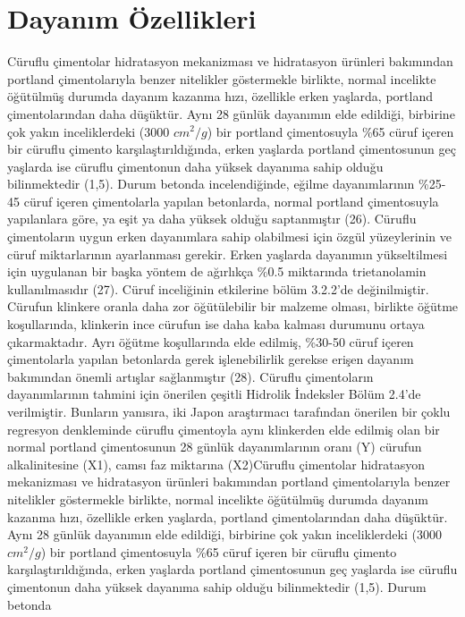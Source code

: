 \documentclass[12pt]{article}
\begin{document}
\section{Dayanım Özellikleri}
Cüruflu çimentolar hidratasyon mekanizması ve hidratasyon ürünleri
bakımından portland çimentolarıyla benzer nitelikler göstermekle birlikte,
normal incelikte öğütülmüş durumda dayanım kazanma hızı, özellikle erken
yaşlarda, portland çimentolarından daha düşüktür. Aynı 28 günlük dayanımın
elde edildiği, birbirine çok yakın inceliklerdeki (3000 $cm^2/g$) bir portland
çimentosuyla \%65 cüruf içeren bir cüruflu çimento karşılaştırıldığında,
erken yaşlarda portland çimentosunun geç yaşlarda ise cüruflu çimentonun
daha yüksek dayanıma sahip olduğu bilinmektedir (1,5). Durum betonda
incelendiğinde, eğilme dayanımlarının \%25-45 cüruf içeren çimentolarla
yapılan betonlarda, normal portland çimentosuyla yapılanlara göre, ya eşit
ya daha yüksek olduğu saptanmıştır (26).
Cüruflu çimentoların uygun erken dayanımlara sahip olabilmesi için özgül
yüzeylerinin ve cüruf miktarlarının ayarlanması gerekir. Erken yaşlarda
dayanımın yükseltilmesi için uygulanan bir başka yöntem de ağırlıkça \%0.5
miktarında trietanolamin kullanılmasıdır (27).
Cüruf inceliğinin etkilerine bölüm 3.2.2’de değinilmiştir. Cürufun klinkere
oranla daha zor öğütülebilir bir malzeme olması, birlikte öğütme koşullarında,
klinkerin ince cürufun ise daha kaba kalması durumunu ortaya çıkarmaktadır.
Ayrı öğütme koşullarında elde edilmiş, \%30-50 cüruf içeren çimentolarla
yapılan betonlarda gerek işlenebilirlik gerekse erişen dayanım bakımından
önemli artışlar sağlanmıştır (28).
Cüruflu çimentoların dayanımlarının tahmini için önerilen çeşitli Hidrolik
İndeksler Bölüm 2.4’de verilmiştir. Bunların yanısıra, iki Japon araştırmacı
tarafından önerilen bir çoklu regresyon denkleminde cüruflu çimentoyla aynı
klinkerden elde edilmiş olan bir normal portland çimentosunun 28 günlük
dayanımlarının oranı (Y) cürufun alkalinitesine (X1), camsı faz miktarına (X2)Cüruflu çimentolar hidratasyon mekanizması ve hidratasyon ürünleri
bakımından portland çimentolarıyla benzer nitelikler göstermekle birlikte,
normal incelikte öğütülmüş durumda dayanım kazanma hızı, özellikle erken
yaşlarda, portland çimentolarından daha düşüktür. Aynı 28 günlük dayanımın
elde edildiği, birbirine çok yakın inceliklerdeki (3000 $cm^2/g$) bir portland
çimentosuyla \%65 cüruf içeren bir cüruflu çimento karşılaştırıldığında,
erken yaşlarda portland çimentosunun geç yaşlarda ise cüruflu çimentonun
daha yüksek dayanıma sahip olduğu bilinmektedir (1,5). Durum betonda
\end{document}
